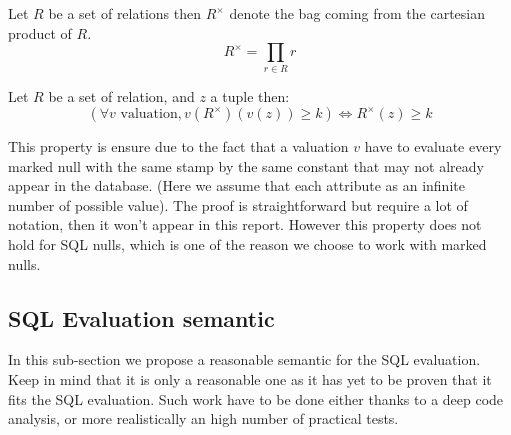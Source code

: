 \begin{mydef}
	Let $R$ be a set of relations then $R^\times$ denote the bag coming from the cartesian product of $R$.
	$$R^\times = \prod_{r \in R}{r}$$
\end{mydef}

\begin{myprop}
	\label{prop1}
	Let $R$ be a set of relation, and $z$ a tuple then:
	$$(\forall v \mbox{ valuation}, v(R^\times)(v(z)) \geq k )\Leftrightarrow R^\times(z) \geq k  $$ 
\end{myprop}
This property is ensure due to the fact that a valuation $v$ have to evaluate every marked null with the same stamp by the same constant that may not already appear in the database. (Here we assume that each attribute as an infinite number of possible value). 
The proof is straightforward but require a lot of notation, then it won't appear in this report.
However this  property does not hold for SQL nulls, which is one of the reason we choose to work with marked nulls.



\subsection{SQL Evaluation semantic}
In this sub-section we propose a reasonable semantic for the SQL evaluation. Keep in mind that it is only a reasonable one as it has yet to be proven that it fits the SQL evaluation. Such work have to be done either thanks to a deep code analysis, or more realistically an high number of practical tests. 


